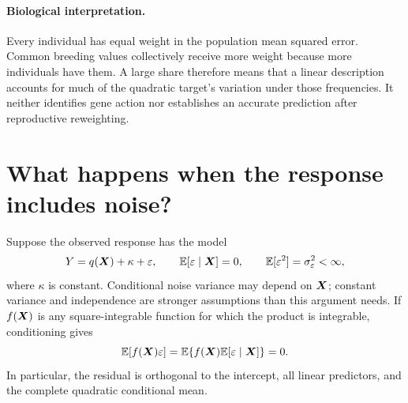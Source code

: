 \paragraph{Biological interpretation.}
Every individual has equal weight in the population mean squared error.
Common breeding values collectively receive more weight because more
individuals have them. A large share therefore means that a linear
description accounts for much of the quadratic target's variation under
those frequencies. It neither identifies gene action nor establishes an
accurate prediction after reproductive reweighting.

\section{What happens when the response includes noise?}
\label{gaussian:noisy_response}

Suppose the observed response has the model
\begin{equation}
Y=q(\boldsymbol{X})+\kappa+\varepsilon,
\qquad \mathbb E[\varepsilon\mid\boldsymbol{X}]=0,
\qquad \mathbb E[\varepsilon^2]=\sigma_\varepsilon^2<\infty,
\label{gaussian:noise_model}
\end{equation}
where $\kappa$ is constant. Conditional noise variance may depend on
$\boldsymbol{X}$; constant variance and independence are stronger assumptions
than this argument needs. If $f(\boldsymbol{X})$ is any square-integrable
function for which the product is integrable, conditioning gives
\begin{equation}
\mathbb E[f(\boldsymbol{X})\varepsilon]
 =\mathbb E\{f(\boldsymbol{X})\mathbb E[\varepsilon\mid\boldsymbol{X}]\}=0.
\label{gaussian:conditional_orthogonality}
\end{equation}
In particular, the residual is orthogonal to the intercept, all linear
predictors, and the complete quadratic conditional mean.

